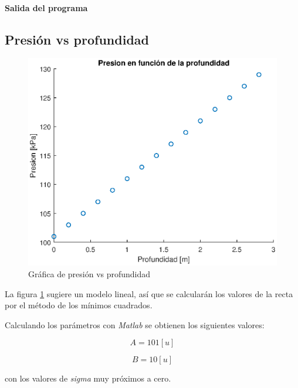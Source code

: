 \documentclass[letter,11pt]{article}
\begin{document}
\paragraph{Salida del programa}
\begin{alltt}
\footnotesize

\normalsize
\end{alltt}

\newpage
\subsection{Presión vs profundidad}
\begin{figure}[!h]
\centering
\includegraphics[scale=1.00]{eps/3.2.1.eps}
\caption{Gráfica de presión vs profundidad}
\label{practica42}
\end{figure}

La figura \ref{practica42} sugiere un modelo lineal, así que se calcularán los
valores de la recta por el método de los mínimos cuadrados.

Calculando los parámetros con \emph{Matlab} se obtienen los siguientes valores:

\begin{equation}
    A = 101 [u]
\end{equation}

\begin{equation}
    B = 10 [u]
\end{equation}

con los valores de \emph{sigma} muy próximos a cero.
\end{document}
